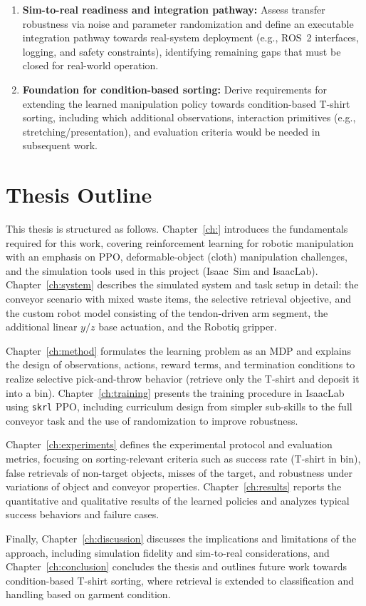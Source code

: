 \begin{enumerate}
  \item \textbf{Sim-to-real readiness and integration pathway:}
  Assess transfer robustness via noise and parameter randomization and define an executable integration pathway towards real-system deployment (e.g., \ac{ROS}~2 interfaces, logging, and safety constraints), identifying remaining gaps that must be closed for real-world operation.

  \item \textbf{Foundation for condition-based sorting:}
  Derive requirements for extending the learned manipulation policy towards condition-based T-shirt sorting, including which additional observations, interaction primitives (e.g., stretching/presentation), and evaluation criteria would be needed in subsequent work.
\end{enumerate}

\section{Thesis Outline} %

This thesis is structured as follows.
Chapter~\ref{ch:} introduces the fundamentals required for this work, covering reinforcement learning for robotic manipulation with an emphasis on \ac{PPO}, deformable-object (cloth) manipulation challenges, and the simulation tools used in this project (Isaac~Sim and IsaacLab).
Chapter~\ref{ch:system} describes the simulated system and task setup in detail: the conveyor scenario with mixed waste items, the selective retrieval objective, and the custom robot model consisting of the tendon-driven arm segment, the additional linear $y/z$ base actuation, and the Robotiq gripper.

Chapter~\ref{ch:method} formulates the learning problem as an \ac{MDP} and explains the design of observations, actions, reward terms, and termination conditions to realize selective pick-and-throw behavior (retrieve only the T-shirt and deposit it into a bin).
Chapter~\ref{ch:training} presents the training procedure in IsaacLab using \texttt{skrl} \ac{PPO}, including curriculum design from simpler sub-skills to the full conveyor task and the use of randomization to improve robustness.

Chapter~\ref{ch:experiments} defines the experimental protocol and evaluation metrics, focusing on sorting-relevant criteria such as success rate (T-shirt in bin), false retrievals of non-target objects, misses of the target, and robustness under variations of object and conveyor properties.
Chapter~\ref{ch:results} reports the quantitative and qualitative results of the learned policies and analyzes typical success behaviors and failure cases.

Finally, Chapter~\ref{ch:discussion} discusses the implications and limitations of the approach, including simulation fidelity and sim-to-real considerations, and Chapter~\ref{ch:conclusion} concludes the thesis and outlines future work towards condition-based T-shirt sorting, where retrieval is extended to classification and handling based on garment condition.